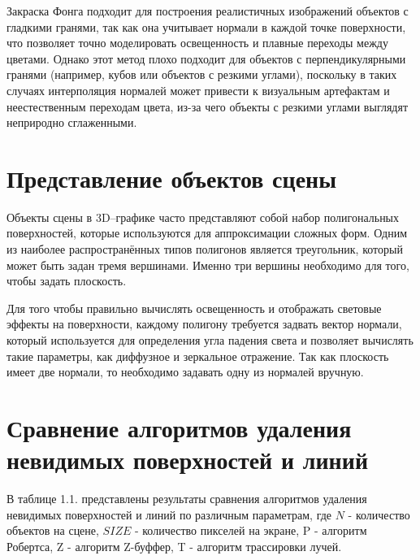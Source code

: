 Закраска Фонга подходит для построения реалистичных изображений объектов с гладкими гранями, так как она учитывает нормали в каждой точке поверхности, что позволяет точно моделировать освещенность и плавные переходы между цветами. Однако этот метод плохо подходит для объектов с перпендикулярными гранями (например, кубов или объектов с резкими углами), поскольку в таких случаях интерполяция нормалей может привести к визуальным артефактам и неестественным переходам цвета, из-за чего объекты с резкими углами выглядят неприродно сглаженными.

\section{Представление объектов сцены}
Объекты сцены в 3D--графике часто представляют собой набор полигональных поверхностей, которые используются для аппроксимации сложных форм. Одним из наиболее распространённых типов полигонов является треугольник, который может быть задан тремя вершинами. Именно три вершины необходимо для того, чтобы задать плоскость.

Для того чтобы правильно вычислять освещенность и отображать световые эффекты на поверхности, каждому полигону требуется задвать вектор нормали, который используется для определения угла падения света и позволяет вычислять такие параметры, как диффузное и зеркальное отражение. Так как плоскость имеет две нормали, то необходимо задавать одну из нормалей вручную. 




\section{Сравнение алгоритмов удаления невидимых поверхностей и линий}
В таблице 1.1. представлены результаты сравнения алгоритмов удаления невидимых поверхностей и линий по различным параметрам, где 
$N$ - количество объектов на сцене, $SIZE$ - количество пикселей на экране, P - алгоритм Робертса, Z - алгоритм Z-буффер, T - алгоритм трассировки лучей. 

